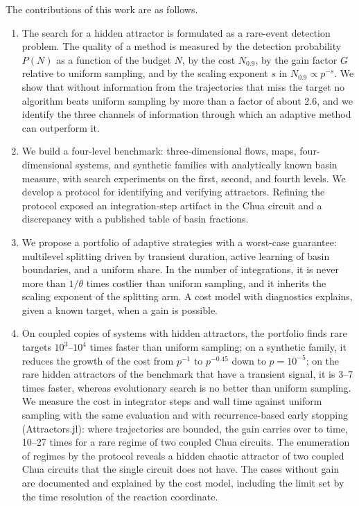 The contributions of this work are as follows.
\begin{enumerate}
\item The search for a hidden attractor is formulated as a rare-event detection problem. The quality of a method is measured by the detection probability $P(N)$ as a function of the budget $N$, by the cost $N_{0.9}$, by the gain factor $G$ relative to uniform sampling, and by the scaling exponent $s$ in $N_{0.9}\propto p^{-s}$. We show that without information from the trajectories that miss the target no algorithm beats uniform sampling by more than a factor of about 2.6, and we identify the three channels of information through which an adaptive method can outperform it.
\item We build a four-level benchmark: three-dimensional flows, maps, four-dimensional systems, and synthetic families with analytically known basin measure, with search experiments on the first, second, and fourth levels. We develop a protocol for identifying and verifying attractors. Refining the protocol exposed an integration-step artifact in the Chua circuit and a discrepancy with a published table of basin fractions.
\item We propose a portfolio of adaptive strategies with a worst-case guarantee: multilevel splitting driven by transient duration, active learning of basin boundaries, and a uniform share. In the number of integrations, it is never more than $1/\theta$ times costlier than uniform sampling, and it inherits the scaling exponent of the splitting arm. A cost model with diagnostics explains, given a known target, when a gain is possible.
\item On coupled copies of systems with hidden attractors, the portfolio finds rare targets $10^3$--$10^4$ times faster than uniform sampling; on a synthetic family, it reduces the growth of the cost from $p^{-1}$ to $p^{-0.45}$ down to $p=10^{-5}$; on the rare hidden attractors of the benchmark that have a transient signal, it is 3--7 times faster, whereas evolutionary search is no better than uniform sampling. We measure the cost in integrator steps and wall time against uniform sampling with the same evaluation and with recurrence-based early stopping (Attractors.jl): where trajectories are bounded, the gain carries over to time, 10--27 times for a rare regime of two coupled Chua circuits. The enumeration of regimes by the protocol reveals a hidden chaotic attractor of two coupled Chua circuits that the single circuit does not have. The cases without gain are documented and explained by the cost model, including the limit set by the time resolution of the reaction coordinate.
\end{enumerate}

